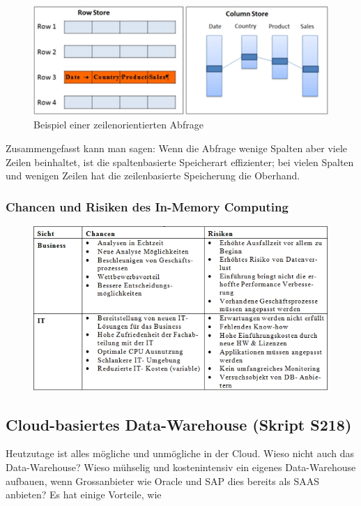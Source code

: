 \documentclass[a4paper, 11pt, nofootinbib]{article}
\begin{document}
\begin{figure}[htb]
	\centering
	\includegraphics[keepaspectratio=true,height=10\baselineskip]{row_based.jpg}
	\caption{Beispiel einer zeilenorientierten Abfrage}
	\label{fig:row_based}
\end{figure}

Zusammengefasst kann man sagen: Wenn die Abfrage wenige Spalten aber viele Zeilen beinhaltet, ist die spaltenbasierte Speicherart effizienter; bei vielen Spalten und wenigen Zeilen hat die zeilenbasierte Speicherung die Oberhand.

\newpage

\subsubsection{Chancen und Risiken des In-Memory Computing}
\begin{figure}[htb]
	\centering
	\includegraphics[keepaspectratio=true,height=15\baselineskip]{in_memory.jpg}
\end{figure}

\subsection{Cloud-basiertes Data-Warehouse (Skript S218)}

Heutzutage ist alles mögliche und unmögliche in der Cloud. Wieso nicht auch das Data-Warehouse? Wieso mühselig und kostenintensiv ein eigenes Data-Warehouse aufbauen, wenn Grossanbieter wie Oracle und SAP dies bereits als SAAS anbieten? Es hat einige Vorteile, wie
\end{document}
